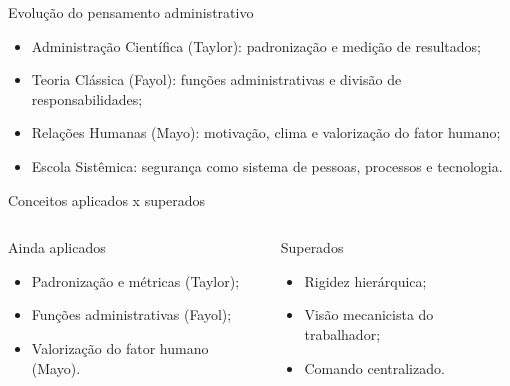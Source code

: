 \documentclass[aspectratio=169,12pt]{beamer}
\begin{document}
\begin{frame}{Evolução do pensamento administrativo}
  \begin{itemize}
    \item Administração Científica (Taylor): padronização e medição de resultados;
    \item Teoria Clássica (Fayol): funções administrativas e divisão de responsabilidades;
    \item Relações Humanas (Mayo): motivação, clima e valorização do fator humano;
    \item Escola Sistêmica: segurança como sistema de pessoas, processos e tecnologia.
  \end{itemize}
\end{frame}

\begin{frame}{Conceitos aplicados x superados}
  \begin{columns}[t]
      \begin{block}{Ainda aplicados}
        \begin{itemize}
          \item Padronização e métricas (Taylor);
          \item Funções administrativas (Fayol);
          \item Valorização do fator humano (Mayo).
        \end{itemize}
      \end{block}
      \begin{block}{Superados}
        \begin{itemize}
          \item Rigidez hierárquica;
          \item Visão mecanicista do trabalhador;
          \item Comando centralizado.
        \end{itemize}
      \end{block}
  \end{columns}
\end{frame}
\end{document}
